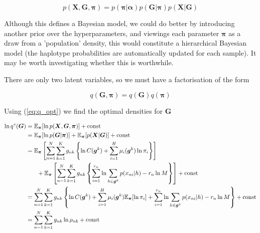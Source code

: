 \documentclass{article}
\begin{document}
\begin{equation}
p(\boldsymbol{X}, \boldsymbol{G}, \boldsymbol{\pi}) = p(\boldsymbol{\pi} | \boldsymbol{\alpha}) p(\boldsymbol{G} | \boldsymbol{\pi}) p(\boldsymbol{X} | \boldsymbol{G})
\end{equation}

Although this defines a Bayesian model, we could do better by introducing another prior over the hyperparameters, and viewings each parameter $\boldsymbol{\pi}$ as a draw from a 'population' density, this would constitute a hierarchical Bayesian model (the haplotype probabilities are automatically updated for each sample). It may be worth investigating whether this is worthwhile. 

There are only two latent variables, so we must have a factorisation of the form

\begin{equation}
q(\boldsymbol{G}, \boldsymbol{\pi}) = q(\boldsymbol{G})q(\boldsymbol{\pi})
\end{equation}

Using (\ref{eq:q_opt}) we find the optimal densities for $\boldsymbol{G}$

\begin{align}
    \ln q^*(\boldsymbol{G}) &= \mathbb{E}_{\boldsymbol{\pi}}[\ln p(\boldsymbol{X}, \boldsymbol{G}, \boldsymbol{\pi})] + \text{const}\notag\\
    &= \mathbb{E}_{\boldsymbol{\pi}}[\ln p(\boldsymbol{G} | \boldsymbol{\pi})] + \mathbb{E}_{\boldsymbol{\pi}}[p(\boldsymbol{X} | \boldsymbol{G})] + \text{const} \notag\\
    &= \mathbb{E}_{\boldsymbol{\pi}}\left[ \sum_{n = 1}^N \sum_{k = 1}^K g_{nk} \left\{ \ln C(\boldsymbol{g}^k) + \sum_{i = 1}^H \mu_i(\boldsymbol{g}^k) \ln \pi_i \right\} \right] \notag\\ &\phantom{{}=1} + \mathbb{E}_{\boldsymbol{\pi}}\left[ \sum_{n = 1}^N \sum_{k = 1}^K g_{nk} \left\{ \sum_{i = 1}^{r_n} \ln \sum_{h \in \boldsymbol{g}^k} p(x_{ni} | h) - r_n \ln M \right\} \right] + \text{const}\notag\\
    &= \sum_{n = 1}^N \sum_{k = 1}^K g_{nk} \left\{ \ln C(\boldsymbol{g}^k) + \sum_{i = 1}^H \mu_i(\boldsymbol{g}^k) \mathbb{E}_{\boldsymbol{\pi}}[\ln \pi_i] + \sum_{i = 1}^{r_n} \ln \sum_{h \in \boldsymbol{g}^k} p(x_{ni} | h) - r_n \ln M \right\} + \text{const}\notag\\
    &= \sum_{n = 1}^N \sum_{k = 1}^K g_{nk} \ln \rho_{nk} + \text{const}
\end{align}
\end{document}
